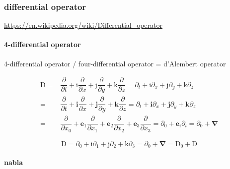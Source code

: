 \documentclass[
]{book}
\theoremstyle{definition}
\theoremstyle{definition}
\theoremstyle{definition}
\theoremstyle{definition}
\theoremstyle{remark}
\begin{document}
\hypertarget{differential-operator}{%
\subsubsection{differential operator}\label{differential-operator}}

\url{https://en.wikipedia.org/wiki/Differential_operator}

\hypertarget{differential-operator-1}{%
\paragraph{4-differential operator}\label{differential-operator-1}}

4-differential operator / four-differential operator = d'Alembert operator

\[
\begin{aligned}
\mathrm{D}= & \dfrac{\partial}{\partial t}+\mathrm{i}\dfrac{\partial}{\partial x}+\mathrm{j}\dfrac{\partial}{\partial y}+\mathrm{k}\dfrac{\partial}{\partial z}=\partial_{{\scriptscriptstyle t}}+\mathrm{i}\partial_{{\scriptscriptstyle x}}+\mathrm{j}\partial_{{\scriptscriptstyle y}}+\mathrm{k}\partial_{z}\\
= & \dfrac{\partial}{\partial t}+\boldsymbol{i}\dfrac{\partial}{\partial x}+\boldsymbol{j}\dfrac{\partial}{\partial y}+\boldsymbol{k}\dfrac{\partial}{\partial z}=\partial_{{\scriptscriptstyle t}}+\boldsymbol{i}\partial_{{\scriptscriptstyle x}}+\boldsymbol{j}\partial_{{\scriptscriptstyle y}}+\boldsymbol{k}\partial_{z}\\
= & \dfrac{\partial}{\partial x_{{\scriptscriptstyle 0}}}+\boldsymbol{e}_{{\scriptscriptstyle 1}}\dfrac{\partial}{\partial x_{{\scriptscriptstyle 1}}}+\boldsymbol{e}_{{\scriptscriptstyle 2}}\dfrac{\partial}{\partial x_{{\scriptscriptstyle 2}}}+\boldsymbol{e}_{{\scriptscriptstyle 3}}\dfrac{\partial}{\partial x_{{\scriptscriptstyle 3}}}=\partial_{{\scriptscriptstyle 0}}+\boldsymbol{e}_{{\scriptscriptstyle i}}\partial_{{\scriptscriptstyle i}}=\partial_{{\scriptscriptstyle 0}}+\boldsymbol{\nabla}
\end{aligned}
\]

\[
\mathrm{D}=\partial_{{\scriptscriptstyle 0}}+\mathrm{i}\partial_{{\scriptscriptstyle 1}}+\mathrm{j}\partial_{{\scriptscriptstyle 2}}+\mathrm{k}\partial_{{\scriptscriptstyle 3}}=\partial_{{\scriptscriptstyle 0}}+\boldsymbol{\nabla}=\mathrm{D}_{{\scriptscriptstyle 0}}+\boldsymbol{\mathrm{D}}
\]

\hypertarget{nabla}{%
\paragraph{nabla}\label{nabla}}
\end{document}
